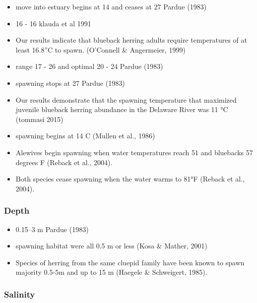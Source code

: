\documentclass[
]{book}
\providecommand{\tightlist}{%
  \setlength{\itemsep}{0pt}\setlength{\parskip}{0pt}}
\begin{document}
\begin{itemize}
\item
  move into estuary begins at 14 and ceases at 27 Pardue (1983)
\item
  16 - 16 klauda et al 1991
\item
  Our results indicate that blueback herring adults require temperatures of at least 16.8''C to spawn. (O'Connell \& Angermeier, 1999)
\item
  range 17 - 26 and optimal 20 - 24 Pardue (1983)
\item
  spawning stops at 27 Pardue (1983)
\item
  Our results demonstrate that the spawning temperature that maximized juvenile blueback herring abundance in the Delaware River was 11 °C (tommasi 2015)
\item
  spawning begins at 14 C (Mullen et al., 1986)
\item
  Alewives begin spawning when water temperatures reach 51 and bluebacks 57 degrees F (Reback et al., 2004).
\item
  Both species cease spawning when the water warms to 81°F (Reback et al., 2004).
\end{itemize}

\hypertarget{depth-3}{%
\subsubsection{Depth}\label{depth-3}}

\begin{itemize}
\tightlist
\item
  0.15--3 m Pardue (1983)
\item
  spawning habitat were all 0.5 m or less (Kosa \& Mather, 2001)
\item
  Species of herring from the same cluepid family have been known to spawn majority 0.5-5m and up to 15 m (Haegele \& Schweigert, 1985).
\end{itemize}

\hypertarget{salinity-3}{%
\subsubsection{Salinity}\label{salinity-3}}
\end{document}

